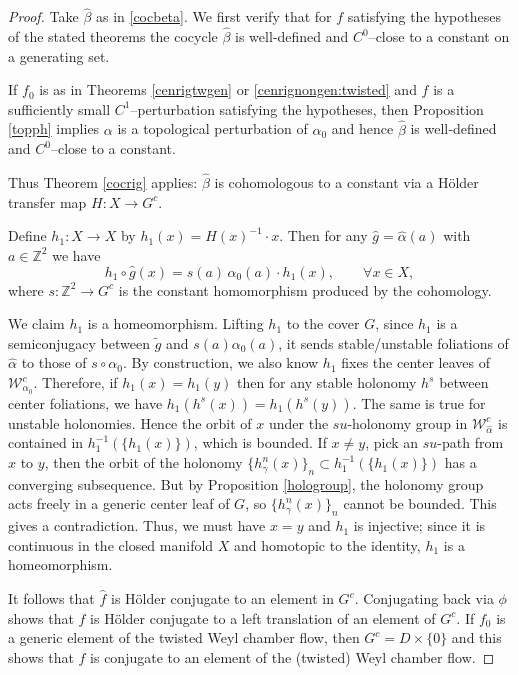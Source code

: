 \documentclass[11pt]{amsart}
\numberwithin{equation}{section}
\newcommand{\Z}{\mathbb{Z}}
\newcommand{\W}{\mathcal{W}}
\theoremstyle{plain}
\begin{document}
\begin{proof}
Take $\hat\beta$ as in \eqref{cocbeta}. We first verify that for $f$
satisfying the hypotheses of the stated theorems the cocycle $\hat\beta$
is well‑defined and $C^0$–close to a constant on a generating set.

If $f_0$ is as in Theorems \ref{cenrigtwgen} or \ref{cenrignongen:twisted} and $f$ is a sufficiently
small $C^1$–perturbation satisfying the hypotheses, then Proposition
\ref{topph} implies $\alpha$ is a topological perturbation of $\alpha_0$
and hence $\hat\beta$ is well‑defined and $C^0$–close to a constant.

Thus Theorem \ref{cocrig} applies: $\hat\beta$ is cohomologous to a
constant via a Hölder transfer map $H:X\to G^c$.

Define $h_1:X\to X$ by $h_1(x)=H(x)^{-1}\cdot x$. Then for any
$\hat g=\hat\alpha(a)$ with $a\in\Z^2$ we have
\begin{equation}\label{chomg}
h_1\circ\hat g(x)=s(a)\,\alpha_0(a)\cdot h_1(x),\qquad\forall x\in X,
\end{equation}
where $s:\Z^2\to G^c$ is the constant homomorphism produced by
the cohomology.

We claim $h_1$ is a homeomorphism. Lifting $h_1$ to the cover $G$, since $h_1$ is a semiconjugacy between $\tilde g$ and $s(a)\alpha_0(a)$, it sends stable/unstable foliations of $\hat \alpha$ to those of $s\circ \alpha_0$. By construction, we also know  $h_1$ fixes the center leaves of $\W^c_{\alpha_0}$. Therefore, if $h_1(x)=h_1(y)$ then for any
stable holonomy $h^s$ between center foliations, we
have $h_1(h^s(x))=h_1(h^s(y))$. The same is true for unstable holonomies. Hence the orbit of $x$ under the $su$-holonomy
group in $\W^c_{\hat \alpha}$ is contained in $h_1^{-1}(\{h_1(x)\})$, which is bounded. If $x\neq y$, pick an $su$-path from $x$ to $y$, then the orbit of the holonomy $\{h_\gamma^n(x)\}_n\subset h_1^{-1}(\{h_1(x)\})$ has a converging subsequence. But by
Proposition \ref{hologroup}, the holonomy group acts freely in a generic
center leaf of $G$, so $\{h_\gamma^n(x)\}_n$ cannot be bounded. This gives a contradiction. Thus, we must have $x=y$ and $h_1$ is injective; since
it is continuous in the closed manifold $X$ and homotopic to the identity, $h_1$ is a
homeomorphism.

It follows that $\hat f$ is Hölder conjugate to an
element in $G^c$. Conjugating back via $\phi$ shows
that $f$ is Hölder conjugate to a left translation of an element of $G^c$. If $f_0$ is a generic element of the twisted Weyl chamber flow, then $G^c=D\times \{0\}$ and this shows that $f$ is conjugate to an element of the (twisted) Weyl chamber flow.



\end{proof}
\end{document}
